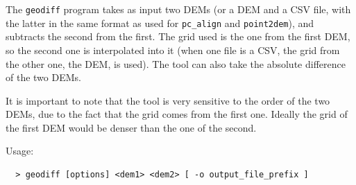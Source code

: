 The \texttt{geodiff} program takes as input two DEMs (or a DEM and a CSV file, with the latter in the same format as used for \texttt{pc\_align} and \texttt{point2dem}), and subtracts the second from the first. The grid used is the one from the first DEM, so the second one is interpolated into it (when one file is a CSV, the grid from the other one, the DEM, is used). The tool can also take the absolute difference of the two DEMs.

It is important to note that the tool is very sensitive to the order of
the two DEMs, due to the fact that the grid comes from the first
one. Ideally the grid of the first DEM would be denser than the one of
the second.

\medskip

Usage:
\begin{verbatim}
  > geodiff [options] <dem1> <dem2> [ -o output_file_prefix ]
\end{verbatim}

